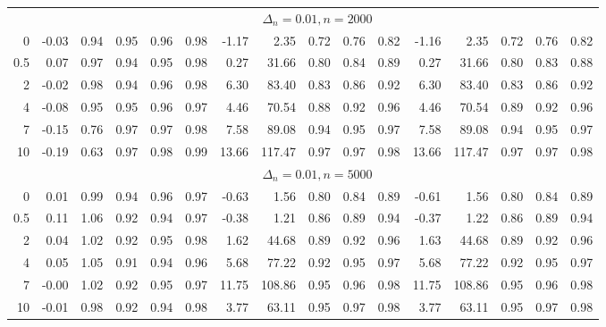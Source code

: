 \documentclass{article}
\theoremstyle{plain}
\theoremstyle{definition}
\theoremstyle{remark}
\begin{document}
\begin{appendix}
{\begin{table}[ht]
\begin{tabular}{r|rrrrr|rrrrr|rrrrr}
	\midrule
	\midrule
	&\multicolumn{15}{c}{$\Delta_n=0.01, n= 2000$}
	\\
0 & -0.03 & 0.94 & 0.95 & 0.96 & 0.98 & -1.17 & 2.35 & 0.72 & 0.76 & 0.82 & -1.16 & 2.35 & 0.72 & 0.76 & 0.82 \\ 
  0.5 & 0.07 & 0.97 & 0.94 & 0.95 & 0.98 & 0.27 & 31.66 & 0.80 & 0.84 & 0.89 & 0.27 & 31.66 & 0.80 & 0.83 & 0.88 \\ 
  2 & -0.02 & 0.98 & 0.94 & 0.96 & 0.98 & 6.30 & 83.40 & 0.83 & 0.86 & 0.92 & 6.30 & 83.40 & 0.83 & 0.86 & 0.92 \\ 
  4 & -0.08 & 0.95 & 0.95 & 0.96 & 0.97 & 4.46 & 70.54 & 0.88 & 0.92 & 0.96 & 4.46 & 70.54 & 0.89 & 0.92 & 0.96 \\ 
  7 & -0.15 & 0.76 & 0.97 & 0.97 & 0.98 & 7.58 & 89.08 & 0.94 & 0.95 & 0.97 & 7.58 & 89.08 & 0.94 & 0.95 & 0.97 \\ 
  10 & -0.19 & 0.63 & 0.97 & 0.98 & 0.99 & 13.66 & 117.47 & 0.97 & 0.97 & 0.98 & 13.66 & 117.47 & 0.97 & 0.97 & 0.98 \\ 
   \midrule
   &\multicolumn{15}{c}{$\Delta_n=0.01, n= 5000$}
   \\
 0 & 0.01 & 0.99 & 0.94 & 0.96 & 0.97 & -0.63 & 1.56 & 0.80 & 0.84 & 0.89 & -0.61 & 1.56 & 0.80 & 0.84 & 0.89 \\ 
  0.5 & 0.11 & 1.06 & 0.92 & 0.94 & 0.97 & -0.38 & 1.21 & 0.86 & 0.89 & 0.94 & -0.37 & 1.22 & 0.86 & 0.89 & 0.94 \\ 
  2 & 0.04 & 1.02 & 0.92 & 0.95 & 0.98 & 1.62 & 44.68 & 0.89 & 0.92 & 0.96 & 1.63 & 44.68 & 0.89 & 0.92 & 0.96 \\ 
  4 & 0.05 & 1.05 & 0.91 & 0.94 & 0.96 & 5.68 & 77.22 & 0.92 & 0.95 & 0.97 & 5.68 & 77.22 & 0.92 & 0.95 & 0.97 \\ 
  7 & -0.00 & 1.02 & 0.92 & 0.95 & 0.97 & 11.75 & 108.86 & 0.95 & 0.96 & 0.98 & 11.75 & 108.86 & 0.95 & 0.96 & 0.98 \\ 
  10 & -0.01 & 0.98 & 0.92 & 0.94 & 0.98 & 3.77 & 63.11 & 0.95 & 0.97 & 0.98 & 3.77 & 63.11 & 0.95 & 0.97 & 0.98 \\ 

\end{tabular}
\end{table}}
\end{appendix}
\end{document}
